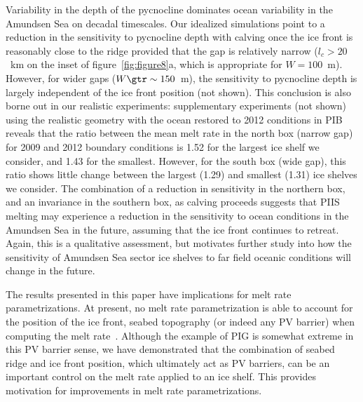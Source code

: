 \documentclass[draft]{agujournal2019}
\begin{document}
Variability in the depth of the pycnocline dominates ocean variability in the Amundsen Sea on decadal timescales. Our idealized simulations point to a reduction in the sensitivity to pycnocline depth with calving once the ice front is reasonably close to the ridge provided that the gap is relatively narrow ($l_c > 20$~km on the inset of figure~\ref{fig:figure8}a, which is appropriate for $W=100$~m). However, for wider gaps ($W \gtr \sim 150$~m), the sensitivity to pycnocline depth is largely independent of the ice front position (not shown). This conclusion is also borne out in our realistic experiments: supplementary experiments (not shown) using the realistic geometry with the ocean restored to 2012 conditions in PIB reveals that the ratio between the mean melt rate in the north box (narrow gap) for 2009 and 2012 boundary conditions is 1.52 for the largest ice shelf we consider, and 1.43 for the smallest. However, for the south box (wide gap), this ratio shows little change between the largest (1.29) and smallest (1.31) ice shelves we consider. The combination of a reduction in sensitivity in the northern box, and an invariance in the southern box, as calving proceeds suggests that PIIS melting may experience a reduction in the sensitivity to ocean conditions in the Amundsen Sea in the future, assuming that the ice front continues to retreat. Again, this is a qualitative assessment, but motivates further study into how the sensitivity of Amundsen Sea sector ice shelves to far field oceanic conditions will change in the future.


The results presented in this paper have implications for melt rate parametrizations. At present, no melt rate parametrization is able to account for the position of the ice front, seabed topography (or indeed any PV barrier) when computing the melt rate~\cite{AsayDavis2017CurrClimChRep, Reese2018Cryo, Bradley2021}. Although the example of PIG is somewhat extreme in this PV barrier sense, we have demonstrated that the combination of seabed ridge and ice front position, which ultimately act as PV barriers, can be an important control on the melt rate applied to an ice shelf. This provides motivation for improvements in melt rate parametrizations. %
\end{document}
